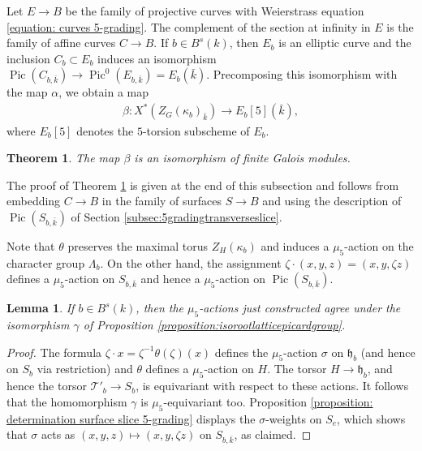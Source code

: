 \documentclass{article} %
\newtheorem{theorem}[proposition]{Theorem}
\newtheorem{lemma}[proposition]{Lemma}
\numberwithin{equation}{section}
\theoremstyle{definition}
\DeclareMathOperator{\Pic}{Pic}
\newcommand{\frakh}{\mathfrak h}
\begin{document}
Let $E\rightarrow B$ be the family of projective curves with Weierstrass equation \eqref{equation: curves 5-grading}.
The complement of the section at infinity in $E$ is the family of affine curves $C\rightarrow B$.
If $b \in B^s(k)$, then $E_b$ is an elliptic curve and the inclusion $C_b\subset E_b$ induces an isomorphism $\Pic(C_{b,\bar{k}})\rightarrow \Pic^0(E_{b,\bar{k}})=E_b(\bar{k})$. 
Precomposing this isomorphism with the map $\alpha$, we obtain a map 
\begin{align*}
    \beta\colon X^*(Z_G(\kappa_b)_{\bar{k}}) \rightarrow E_b[5](\bar{k}),
\end{align*}
where $E_b[5]$ denotes the $5$-torsion subscheme of $E_b$.


\begin{theorem}\label{theorem: centralizer isomorphic to 5-torsion}
    The map $\beta$ is an isomorphism of finite Galois modules.
\end{theorem}



The proof of Theorem \ref{theorem: centralizer isomorphic to 5-torsion} is given at the end of this subsection and follows from embedding $C\rightarrow B$ in the family of surfaces $S\rightarrow B$ and using the description of $\Pic(S_{b,\bar{k}})$ of Section \ref{subsec:5gradingtransverseslice}.


Note that $\theta$ preserves the maximal torus $Z_H(\kappa_b)$ and induces a $\mu_5$-action on the character group $\Lambda_b$. 
On the other hand, the assignment $\zeta\cdot (x,y,z) = (x,y,\zeta z)$ defines a $\mu_5$-action on $S_{b,\bar{k}}$ and hence a $\mu_5$-action on $\Pic(S_{b,\bar{k}})$. 
\begin{lemma}\label{lemma: mu5 actions coincide}
    If $b\in B^s(k)$, then the $\mu_5$-actions just constructed agree under the isomorphism $\gamma$ of Proposition \ref{proposition:isorootlatticepicardgroup}.
\end{lemma}
\begin{proof}
    The formula $\zeta \cdot x = \zeta^{-1} \theta(\zeta)(x)$ defines the $\mu_5$-action $\sigma$ on $\frakh_b$ (and hence on $S_b$ via restriction) and $\theta$ defines a $\mu_5$-action on $H$.
    The torsor $H\rightarrow \frakh_b$, and hence the torsor $\mathcal{T}'_b\rightarrow S_b$, is equivariant with respect to these actions. 
    It follows that the homomorphism $\gamma$ is $\mu_5$-equivariant too. 
    Proposition \ref{proposition: determination surface slice 5-grading} displays the $\sigma$-weights on $S_e$, which shows that $\sigma$ acts as $(x,y,z)\mapsto (x,y,\zeta z)$ on $S_{b, \bar{k}}$, as claimed.
\end{proof}
\end{document}

